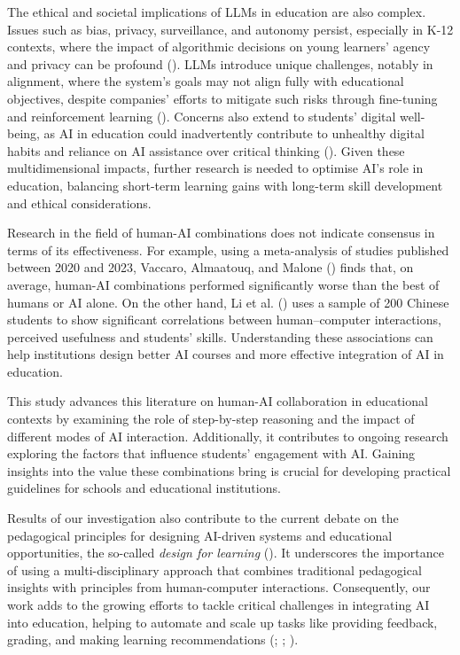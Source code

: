 \documentclass[
  11pt,
]{article}
\begin{document}
The ethical and societal implications of LLMs in education are also complex. Issues such as bias, privacy, surveillance, and autonomy persist, especially in K-12 contexts, where the impact of algorithmic decisions on young learners' agency and privacy can be profound (). LLMs introduce unique challenges, notably in alignment, where the system's goals may not align fully with educational objectives, despite companies' efforts to mitigate such risks through fine-tuning and reinforcement learning (). Concerns also extend to students' digital well-being, as AI in education could inadvertently contribute to unhealthy digital habits and reliance on AI assistance over critical thinking (). Given these multidimensional impacts, further research is needed to optimise AI's role in education, balancing short-term learning gains with long-term skill development and ethical considerations.

Research in the field of human-AI combinations does not indicate consensus in terms of its effectiveness. For example, using a meta-analysis of studies published between 2020 and 2023, Vaccaro, Almaatouq, and Malone () finds that, on average, human-AI combinations performed significantly worse than the best of humans or AI alone. On the other hand, Li et al. () uses a sample of 200 Chinese students to show significant correlations between human--computer interactions, perceived usefulness and students' skills. Understanding these associations can help institutions design better AI courses and more effective integration of AI in education.

This study advances this literature on human-AI collaboration in educational contexts by examining the role of step-by-step reasoning and the impact of different modes of AI interaction. Additionally, it contributes to ongoing research exploring the factors that influence students' engagement with AI. Gaining insights into the value these combinations bring is crucial for developing practical guidelines for schools and educational institutions.

Results of our investigation also contribute to the current debate on the pedagogical principles for designing AI-driven systems and educational opportunities, the so-called \emph{design for learning} (). It underscores the importance of using a multi-disciplinary approach that combines traditional pedagogical insights with principles from human-computer interactions. Consequently, our work adds to the growing efforts to tackle critical challenges in integrating AI into education, helping to automate and scale up tasks like providing feedback, grading, and making learning recommendations (; ; ).
\end{document}
